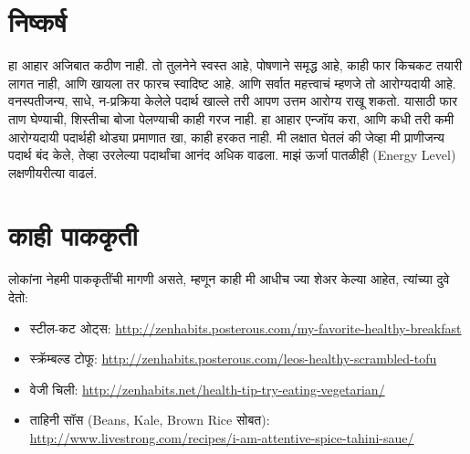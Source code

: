 \section*{निष्कर्ष}
हा आहार अजिबात कठीण नाही. तो तुलनेने स्वस्त आहे, पोषणाने समृद्ध आहे, काही फार किचकट तयारी लागत नाही, आणि खायला तर फारच स्वादिष्ट आहे.
आणि सर्वात महत्त्वाचं म्हणजे तो आरोग्यदायी आहे. वनस्पतीजन्य, साधे, न-प्रक्रिया केलेले पदार्थ खाल्ले तरी
 आपण उत्तम आरोग्य राखू शकतो. यासाठी फार ताण घेण्याची, शिस्तीचा बोजा पेलण्याची काही गरज नाही.
 हा आहार एन्जॉय करा, आणि कधी तरी कमी आरोग्यदायी पदार्थही थोड्या प्रमाणात खा, काही हरकत नाही.
मी लक्षात घेतलं की जेव्हा मी प्राणीजन्य पदार्थ बंद केले, तेव्हा उरलेल्या पदार्थांचा आनंद अधिक वाढला.
 माझं ऊर्जा पातळीही (Energy Level) लक्षणीयरीत्या वाढलं.
\section*{काही पाककृती}
लोकांना नेहमी पाककृतींची मागणी असते, म्हणून काही मी आधीच ज्या शेअर केल्या आहेत, त्यांच्या दुवे देतो:
\begin{itemize}
\item स्टील-कट ओट्स: \url{http://zenhabits.posterous.com/my-favorite-healthy-breakfast}
\item स्क्रॅम्बल्ड टोफू: \url{http://zenhabits.posterous.com/leos-healthy-scrambled-tofu}
\item वेजी चिली: \url{http://zenhabits.net/health-tip-try-eating-vegetarian/}
\item ताहिनी सॉस (Beans, Kale, Brown Rice सोबत): \url{http://www.livestrong.com/recipes/i-am-attentive-spice-tahini-saue/}
 \end{itemize}
